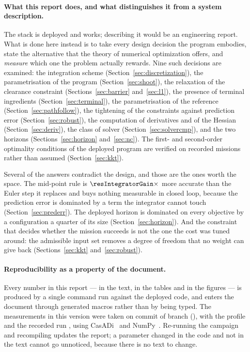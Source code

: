 \documentclass[11pt,a4paper]{article}
\begin{document}
\paragraph{What this report does, and what distinguishes it from a system description.}
The stack is deployed and works; describing it would be an engineering report. What is done here instead is
to take every design decision the program embodies, state the alternative that the theory of numerical
optimization offers, and \emph{measure} which one the problem actually rewards. Nine such decisions are
examined: the integration scheme (Section~\ref{sec:discretization}), the parametrisation of the program
(Section~\ref{sec:shoot}), the relaxation of the clearance constraint (Sections~\ref{sec:barrier}
and~\ref{sec:l1}), the presence of terminal ingredients (Section~\ref{sec:terminal}), the parametrisation of
the reference (Section~\ref{sec:pathfollow}), the tightening of the constraints against prediction error
(Section~\ref{sec:robust}), the computation of derivatives and of the Hessian (Section~\ref{sec:deriv}), the
class of solver (Section~\ref{sec:solvercmp}), and the two horizons (Sections~\ref{sec:horizon}
and~\ref{sec:nc}). The first- and second-order optimality conditions of the deployed program are verified on
recorded missions rather than assumed (Section~\ref{sec:kkt}).

Several of the answers contradict the design, and those are the ones worth the space. The mid-point rule is
$\resIntegratorGain\times$ more accurate than the Euler step it replaces and buys nothing measurable in
closed loop, because the prediction error is dominated by a term the integrator cannot touch
(Section~\ref{sec:prederr}). The deployed horizon is dominated on every objective by a configuration a
quarter of its size (Section~\ref{sec:horizon}). And the constraint that decides whether the mission succeeds
is not the one the cost was tuned around: the admissible input set removes a degree of freedom that no
weight can give back (Sections~\ref{sec:kkt} and~\ref{sec:robust}).

\paragraph{Reproducibility as a property of the document.}
Every number in this report --- in the text, in the tables and in the figures --- is produced by a single
command run against the deployed code, and enters the document through generated macros rather than by being
typed. The measurements in this version were taken on commit \texttt{\resCommit} of branch
\texttt{\resBranch} (\resDate), with the profile \resProfile{} and the recorded run \resBag, using
CasADi~\resCasadi{} and NumPy~\resNumpy. Re-running the campaign and recompiling updates the report;
a parameter changed in the code and not in the text cannot go unnoticed, because there is no text to change.
\end{document}
